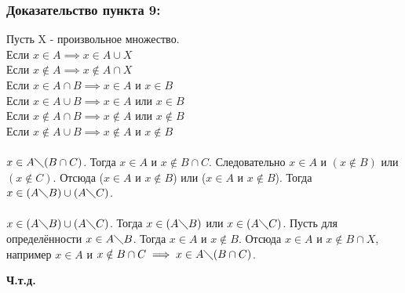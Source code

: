 \documentclass[12pt]{article}
\begin{document}
    \subsubsection*{Доказательство пункта 9:}
    \begin{adjustwidth}{1.5em}{1.5em}
        Пусть X - произвольное множество.\\
        Если $x \in A \implies x \in A \cup X$\\
        Если $x \notin A \implies x \notin A \cap X$\\
        Если $x \in A \cap B \implies x \in A \text{ и } x \in B$\\
        Если $x \in A \cup B \implies x \in A \text{ или } x \in B$\\
        Если $x \notin A \cap B \implies x \notin A \text{ или } x \notin B$\\
        Если $x \notin A \cup B \implies x \notin A \text{ и } x \notin B$\\
        \\
        $x \in A \diagdown (B \cap C)$. Тогда $x \in A$ и $x \notin B \cap C$. Следовательно $x \in A$ и $(x \notin B)$ или $(x \notin C)$. Отсюда ($x \in A$ и $x \notin B$) или ($x \in A$ и $x \notin B$). Тогда $x \in (A \diagdown B) \cup (A \diagdown C)$.\\\\
        $x \in (A \diagdown B) \cup (A \diagdown C)$. Тогда $x \in (A \diagdown B)$ или $x \in (A \diagdown C)$. Пусть для определённости $x \in A \diagdown B$. Тогда $x \in A$ и $x \notin B$. Отсюда $x \in A$ и $x \notin B \cap X$, например $x \in A$ и $x \notin B \cap C \implies x \in A \diagdown (B \cap C)$.
        \begin{center}
            \textbf{Ч.т.д.}
        \end{center}
    \end{adjustwidth}
\end{document}
